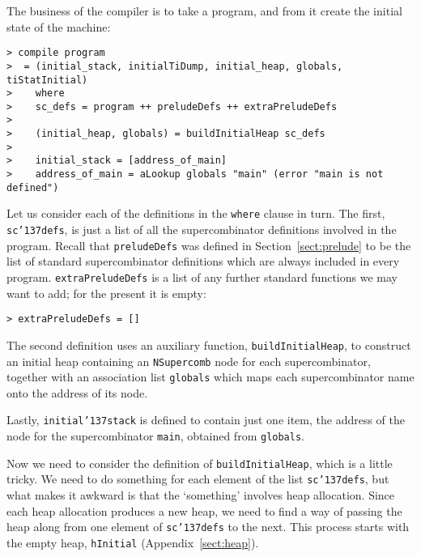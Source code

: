 The business of the compiler is to take a program, and from
it create the initial state of the machine:
\begin{verbatim}
> compile program
>  = (initial_stack, initialTiDump, initial_heap, globals, tiStatInitial)
>    where
>    sc_defs = program ++ preludeDefs ++ extraPreludeDefs
>
>    (initial_heap, globals) = buildInitialHeap sc_defs
>
>    initial_stack = [address_of_main]
>    address_of_main = aLookup globals "main" (error "main is not defined")
\end{verbatim}
%
\par
Let us consider each of the definitions in the \mbox{\tt where} clause in turn.
The first, \mbox{\tt sc{\char'137}defs}, is just a list
of all the supercombinator definitions involved in the program.
Recall that \mbox{\tt preludeDefs} was defined in Section~\ref{sect:prelude}
to be the list of standard supercombinator definitions which
are always included in every program.  \mbox{\tt extraPreludeDefs} is a list of
any further standard functions we may want to add; for the present it is
empty:
\begin{verbatim}
> extraPreludeDefs = []
\end{verbatim}
%
\par
The second definition uses an auxiliary function, \mbox{\tt buildInitialHeap}, to
construct an initial heap containing an \mbox{\tt NSupercomb} node for
each supercombinator, together with an association list \mbox{\tt globals} which
maps each supercombinator name onto the address of its node.

Lastly, \mbox{\tt initial{\char'137}stack} is defined to contain just one item, the address
of the node for the supercombinator \mbox{\tt main}, obtained from \mbox{\tt globals}.

Now we need to consider the definition of \mbox{\tt buildInitialHeap},
which is a little
tricky.  We need to do something for each element of the list \mbox{\tt sc{\char'137}defs},
but what makes it awkward is that the `something' involves heap allocation.
Since each heap allocation produces a new heap, we need to find a way of
passing the heap along from one element of \mbox{\tt sc{\char'137}defs} to the next.
This process starts with the empty heap, \mbox{\tt hInitial}
(Appendix~\ref{sect:heap}).

